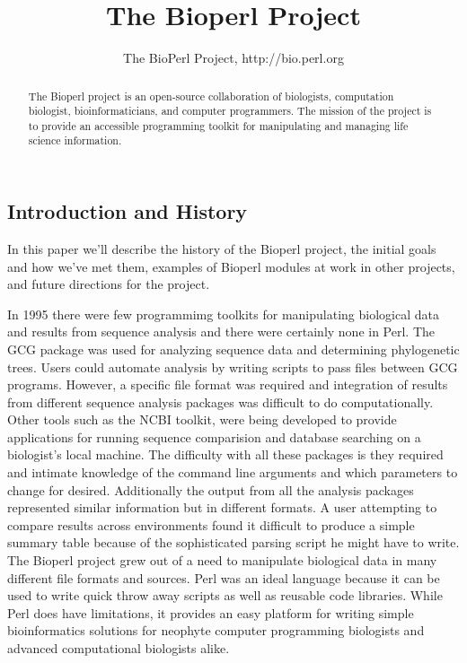 \documentclass{article}
\begin{document}
\begin{twocolumn}
\title{The Bioperl Project}
\author{The BioPerl Project, http://bio.perl.org}
\maketitle

\begin{abstract}
The Bioperl project is an open-source collaboration of biologists,
computation biologist, bioinformaticians, and computer programmers.
The mission of the project is to provide an accessible programming
toolkit for manipulating and managing life science information.
\end{abstract}

\section{Introduction and History}

In this paper we'll describe the history of the Bioperl project, the
initial goals and how we've met them, examples of Bioperl modules at
work in other projects, and future directions for the project.

In 1995 there were few programmimg toolkits for manipulating
biological data and results from sequence analysis and there were
certainly none in Perl.  The GCG package \cite{GCG} was used for
analyzing sequence data and determining phylogenetic trees.  Users
could automate analysis by writing scripts to pass files between GCG
programs.  However, a specific file format was required and
integration of results from different sequence analysis packages was
difficult to do computationally. Other tools such as the NCBI toolkit,
were being developed to provide applications for running sequence
comparision and database searching on a biologist's local machine.
The difficulty with all these packages is they required and intimate
knowledge of the command line arguments and which parameters to change
for desired.  Additionally the output from all the analysis packages
represented similar information but in different formats.  A user
attempting to compare results across environments found it difficult
to produce a simple summary table because of the sophisticated parsing
script he might have to write. \\

The Bioperl project grew out of a need to manipulate biological data
in many different file formats and sources.  Perl was an ideal
language because it can be used to write quick throw away scripts as
well as reusable code libraries.  While Perl does have limitations, it
provides an easy platform for writing simple bioinformatics solutions
for neophyte computer programming biologists and advanced
computational biologists alike.


\end{twocolumn}
\end{document}
